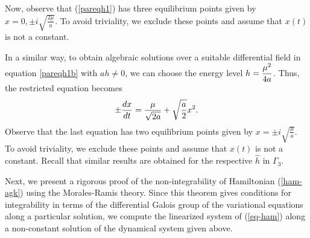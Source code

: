 \documentclass[final]{siamart0516}
\begin{document}
Now, observe that  (\ref{pareqh1}) has  three equilibrium points given by
$\displaystyle{x=0,\pm i\sqrt{\frac{2\mu}{a}}}$.
To avoid triviality, we exclude these points and assume that $x(t)$ is not a constant.

In a similar way, to obtain algebraic solutions over a suitable differential field  in equation \eqref{pareqh1b} with $ah\neq 0$, we can choose the energy level $\displaystyle{h={\mu^2\over 4a}}$. Thus, the restricted equation becomes 
$$\pm\frac{dx}{dt}={\mu\over \sqrt{2a}}+ \sqrt{a\over 2}x^2.$$ Observe that the last equation has two equilibrium points given by $\displaystyle{x=\pm i\sqrt{\frac{\mu}{a}}}$. To avoid triviality, we exclude these points and assume that $x(t)$ is not a constant. Recall that similar results are obtained for the respective $\hat{h}$ in $\Gamma_3$.

Next, we  present a rigorous proof  of the  non-integrability of Hamiltonian (\ref{ham-agk})
 using the Morales-Ramis theory. Since this theorem gives conditions for integrability in  terms of the differential Galois group 
of  the variational equations along a particular solution,
we  compute the  linearized system of (\ref{eq-ham})  along a non-constant solution of the dynamical system  given above.
\end{document}
